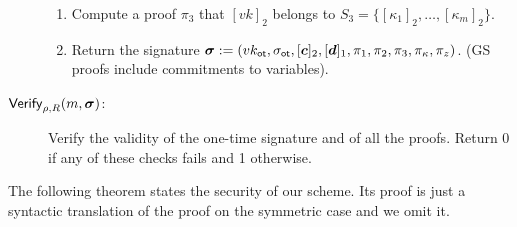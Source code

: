 \begin{description}
\begin{enumerate}
\item Compute a proof $\pi_3$ that $[vk]_2$ belongs to $S_3=\{[\kappa_1]_2,\ldots,[\kappa_m]_2\}$.
\item Return the signature ${\boldsymbol \sigma}:=(vk_\mathsf{ot},\sigma_\mathsf{ot},[{\boldsymbol{c}}]_2,[{\boldsymbol{d}}]_1,\pi_1,\pi_2,\pi_3,\pi_\kappa,\pi_z)$. (GS proofs include commitments to variables).
\end{enumerate}
\item[$\mathsf{Verify}_{\rho,R}(m,{\boldsymbol \sigma})$:] Verify the validity of the one-time signature and of all the proofs. Return 0 if any of these checks fails and 1 otherwise.
\end{description}

The following theorem states the security of our scheme. Its proof is just a syntactic translation of the proof on the symmetric case and we omit it.

